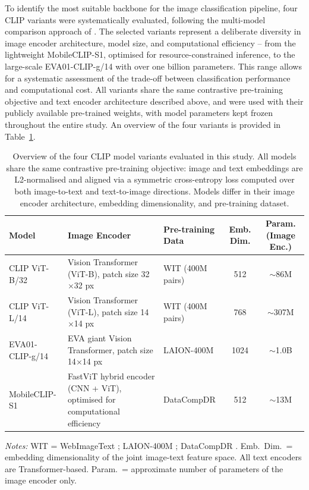 \documentclass[hidelinks, 11pt]{article}
\begin{document}
To identify the most suitable backbone for the image classification pipeline, four CLIP variants were systematically evaluated, following the multi-model comparison approach of \citet{liao_mapping_2025}. The selected variants represent a deliberate diversity in image encoder architecture, model size, and computational efficiency -- from the lightweight MobileCLIP-S1, optimised for resource-constrained inference, to the large-scale EVA01-CLIP-g/14 with over one billion parameters. This range allows for a systematic assessment of the trade-off between classification performance and computational cost. All variants share the same contrastive pre-training objective and text encoder architecture 
described above, and were used with their publicly available pre-trained weights, with model parameters kept frozen throughout the entire study. An overview of the four variants is provided in Table~\ref{tab:clip_models}.

\begin{table}[h]
\centering
\caption{Overview of the four CLIP model variants evaluated in this study. All models share the same contrastive pre-training objective: image and text embeddings are L2-normalised and aligned via a symmetric cross-entropy loss computed over both image-to-text and text-to-image directions. Models differ in their image encoder architecture, embedding dimensionality, and pre-training dataset.}
\label{tab:clip_models}
\begin{tabular}{p{3cm}p{4cm}p{2.5cm}cc}
\hline
\textbf{Model} & \textbf{Image Encoder} & \textbf{Pre-training Data}
& \textbf{Emb. Dim.} & \textbf{Param. (Image Enc.)} \\
\hline
CLIP ViT-B/32
    & Vision Transformer (ViT-B), patch size 32$\times$32 px
    & WIT (400M pairs)
    & 512  & $\sim$86M  \\[6pt]
CLIP ViT-L/14
    & Vision Transformer (ViT-L), patch size 14$\times$14 px
    & WIT (400M pairs)
    & 768  & $\sim$307M \\[6pt]
EVA01-CLIP-g/14
    & EVA giant Vision Transformer, patch size 14$\times$14 px
    & LAION-400M
    & 1024 & $\sim$1.0B \\[6pt]
MobileCLIP-S1
    & FastViT hybrid encoder (CNN + ViT), optimised for
      computational efficiency
    & DataCompDR
    & 512  & $\sim$13M  \\
\hline
\end{tabular}
\begin{minipage}{\textwidth}
\bigskip\raggedright\small
\textit{Notes:} WIT = WebImageText \citep{radford2021learning};
LAION-400M \citep{schuhmann2021laion}; DataCompDR \citep{gadre2023datacomp}.
Emb.\ Dim.\ = embedding dimensionality of the joint image-text feature space.
All text encoders are Transformer-based. Param.\ = approximate number of
parameters of the image encoder only.
\end{minipage}
\end{table}
\end{document}
